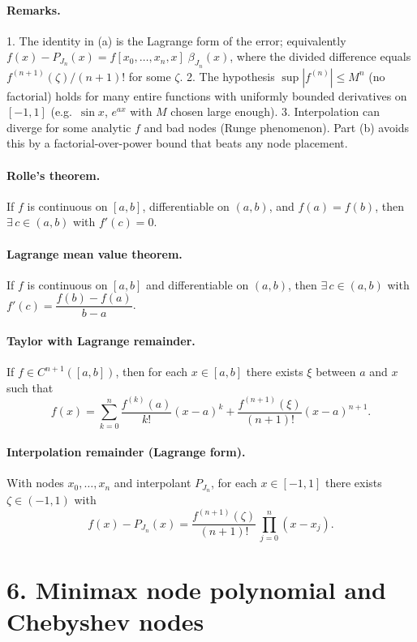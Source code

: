 \documentclass[11pt,a4paper]{article}
\theoremstyle{definition}
\theoremstyle{definition}
\theoremstyle{plain}
\theoremstyle{remark}
\begin{document}
\paragraph{Remarks.}
1. The identity in (a) is the Lagrange form of the error; equivalently
$f(x)-P_{J_n}(x)=f[x_0,\dots,x_n,x]\;\beta_{J_n}(x)$, where the divided difference equals
$f^{(n+1)}(\zeta)/(n+1)!$ for some $\zeta$.
2. The hypothesis $\sup|f^{(n)}|\le M^n$ (no factorial) holds for many entire functions with
uniformly bounded derivatives on $[-1,1]$ (e.g.\ $\sin x$, $e^{ax}$ with $M$ chosen large enough).
3. Interpolation can diverge for some analytic $f$ and bad nodes (Runge phenomenon). Part (b) avoids
this by a factorial-over-power bound that beats any node placement.

\paragraph{Rolle's theorem.}
If $f$ is continuous on $[a,b]$, differentiable on $(a,b)$, and $f(a)=f(b)$, then
$\exists\,c\in(a,b)$ with $f'(c)=0$.

\paragraph{Lagrange mean value theorem.}
If $f$ is continuous on $[a,b]$ and differentiable on $(a,b)$, then
$\exists\,c\in(a,b)$ with $f'(c)=\dfrac{f(b)-f(a)}{b-a}$.

\paragraph{Taylor with Lagrange remainder.}
If $f\in C^{n+1}([a,b])$, then for each $x\in[a,b]$ there exists $\xi$ between $a$ and $x$ such that
\[
f(x)=\sum_{k=0}^{n}\frac{f^{(k)}(a)}{k!}(x-a)^k+\frac{f^{(n+1)}(\xi)}{(n+1)!}(x-a)^{n+1}.
\]

\paragraph{Interpolation remainder (Lagrange form).}
With nodes $x_0,\dots,x_n$ and interpolant $P_{J_n}$, for each $x\in[-1,1]$ there exists $\zeta\in(-1,1)$ with
\[
f(x)-P_{J_n}(x)=\frac{f^{(n+1)}(\zeta)}{(n+1)!}\,\prod_{j=0}^{n}(x-x_j).
\]

\section*{6. Minimax node polynomial and Chebyshev nodes}
\end{document}
